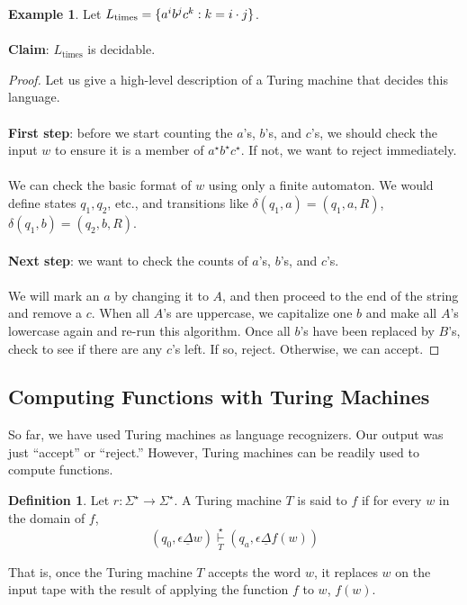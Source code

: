 \documentclass[]{article}
\DeclarePairedDelimiter{\set}{\lbrace}{\rbrace}
\theoremstyle{definition}
\newtheorem*{defn}{Definition}
\newtheorem{ex}{Example}[section]
\begin{document}
      \begin{ex}
        Let $L_\text{times} = \set{a^ib^jc^k : k = i \cdot j}$.
        \\ \\
        \textbf{Claim}: $L_\text{times}$ is decidable.

        \begin{proof}
          Let us give a high-level description of a Turing machine that decides this language.
          \\ \\
          \textbf{First step}: before we start counting the $a$'s, $b$'s, and $c$'s, we should check the input $w$ to ensure it is a member of $a^\star b^\star c^\star$. If not, we want to reject immediately.
          \\ \\
          We can check the basic format of $w$ using only a finite automaton. We would define states $q_1, q_2$, etc., and transitions like $\delta(q_1, a) = (q_1, a, R)$, $\delta(q_1, b) = (q_2, b, R)$.
          \\ \\
          \textbf{Next step}: we want to check the counts of $a$'s, $b$'s, and $c$'s.
          \\ \\
          We will mark an $a$ by changing it to $A$, and then proceed to the end of the string and remove a $c$. When all $A$'s are uppercase, we capitalize one $b$ and make all $A$'s lowercase again and re-run this algorithm. Once all $b$'s have been replaced by $B$'s, check to see if there are any $c$'s left. If so, reject. Otherwise, we can accept.
        \end{proof}
      \end{ex}

    \subsection{Computing Functions with Turing Machines}
      So far, we have used Turing machines as language recognizers. Our output was just ``accept'' or ``reject.'' However, Turing machines can be readily used to compute functions.

      \begin{defn}
        Let $r : \Sigma^\star \to \Sigma^\star$. A Turing machine $T$ is said to  $f$ if for every $w$ in the domain of $f$,
        $$
          (q_0, \epsilon \underline{\Delta}w) \underset{T}{\overset{\star}{\vdash}} (q_a, \epsilon \underline{\Delta} f(w))
        $$

        That is, once the Turing machine $T$ accepts the word $w$, it replaces $w$ on the input tape with the result of applying the function $f$ to $w$, $f(w)$.
      \end{defn}
\end{document}
